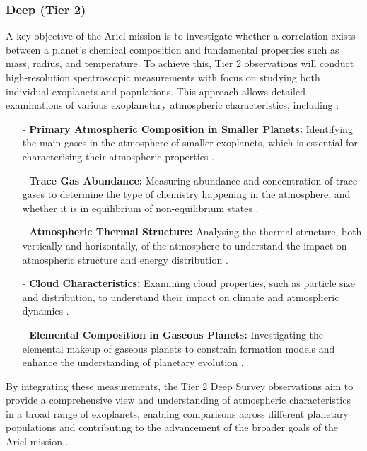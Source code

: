 \documentclass[12pt]{article}
\begin{document}
\subsubsection{Deep (Tier 2)} \label{sec:3.3.2}

A key objective of the Ariel mission is to investigate whether a correlation exists between a planet's chemical composition and fundamental properties such as mass, radius, and temperature. To achieve this, Tier 2 observations will conduct high-resolution spectroscopic measurements with focus on studying both individual
exoplanets and populations. This approach allows detailed examinations of various exoplanetary atmospheric characteristics, including \cite{salvignol2024ariel}:

\begin{itemize}
    \item[-] \textbf{Primary Atmospheric Composition in Smaller Planets:} Identifying the main gases in the atmosphere of smaller exoplanets, which is essential for characterising their atmospheric properties \cite{salvignol2024ariel}.
    \item[-] \textbf{Trace Gas Abundance:} Measuring abundance and concentration of trace gases to determine the type of chemistry happening in the atmosphere, and whether it is in equilibrium of non-equilibrium states \cite{salvignol2024ariel}.
    \item[-] \textbf{Atmospheric Thermal Structure:} Analysing the thermal structure, both vertically and horizontally, of the atmosphere to understand the impact on atmospheric structure and energy distribution \cite{salvignol2024ariel}.
    \item[-] \textbf{Cloud Characteristics:} Examining cloud properties, such as particle size and distribution, to understand their impact on climate and atmospheric dynamics \cite{salvignol2024ariel}.
    \item[-] \textbf{Elemental Composition in Gaseous Planets:} Investigating the elemental makeup of gaseous planets to constrain formation models and enhance the understanding of planetary evolution \cite{salvignol2024ariel}.
\end{itemize}

By integrating these measurements, the Tier 2 Deep Survey observations aim to provide a comprehensive view and understanding of atmospheric characteristics in a broad range of exoplanets, enabling comparisons across different planetary populations and contributing to the advancement of the broader goals of the Ariel mission \cite{salvignol2024ariel}.
\end{document}
